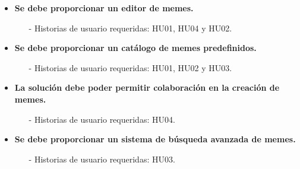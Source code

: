 \begin{itemize}
    \item \textbf{Se debe proporcionar un editor de memes.}
    \begin{itemize}
        \item[-] Historias de usuario requeridas: HU01, HU04 y HU02.
    \end{itemize}
    \item \textbf{Se debe proporcionar un catálogo de memes predefinidos.}
    \begin{itemize}
        \item[-] Historias de usuario requeridas: HU01, HU02 y HU03.
    \end{itemize}
    \item \textbf{La solución debe poder permitir colaboración en la creación de memes.}
    \begin{itemize}
        \item[-] Historias de usuario requeridas: HU04.
    \end{itemize}
    \item \textbf{Se debe proporcionar un sistema de búsqueda avanzada de memes.}
    \begin{itemize}
        \item[-] Historias de usuario requeridas: HU03.
    \end{itemize} 
\end{itemize}